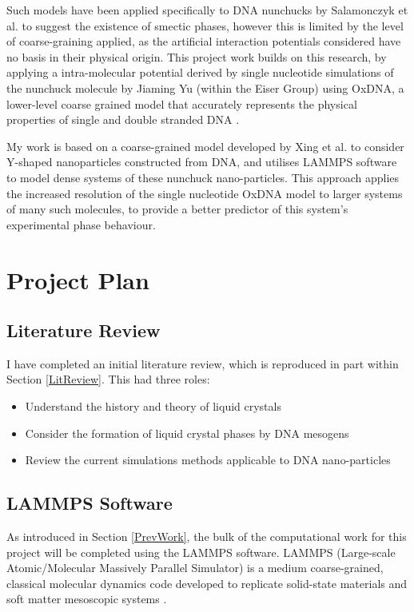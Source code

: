 \documentclass[11pt, a4paper]{article} %
\begin{document}
Such models have been applied specifically to DNA nunchucks by Salamonczyk et al. \cite{Salamonczyk2016} to suggest the existence of smectic phases, however this is limited by the level of coarse-graining applied, as the artificial interaction potentials considered have no basis in their physical origin. This project work builds on this research, by applying a intra-molecular potential derived by single nucleotide simulations of the nunchuck molecule by Jiaming Yu (within the Eiser Group) using OxDNA, a lower-level coarse grained model that accurately represents the physical properties of single and double stranded DNA \cite{OxDNA}.

My work is based on a coarse-grained model developed by Xing et al. \cite{Xing2019} to consider Y-shaped nanoparticles constructed from DNA, and utilises LAMMPS \cite{LAMMPS} software to model dense systems of these nunchuck nano-particles. This approach applies the increased resolution of the single nucleotide OxDNA model to larger systems of many such molecules, to provide a better predictor of this system's experimental phase behaviour.

\section{Project Plan} \label{ProjPlan}
\subsection{Literature Review}
I have completed an initial literature review, which is reproduced in part within Section \ref{LitReview}. This had three roles:

\begin{itemize}
	\item Understand the history and theory of liquid crystals 
	\item Consider the formation of liquid crystal phases by DNA mesogens
	\item Review the current simulations methods applicable to DNA nano-particles
\end{itemize}

\subsection{LAMMPS Software}
As introduced in Section \ref{PrevWork}, the bulk of the computational work for this project will be completed using the LAMMPS software. LAMMPS (Large-scale Atomic/Molecular Massively Parallel Simulator) is a medium coarse-grained, classical molecular dynamics code developed to replicate  solid-state materials and soft matter mesoscopic systems \cite{Plimpton1995, LAMMPS}. 
\end{document}
